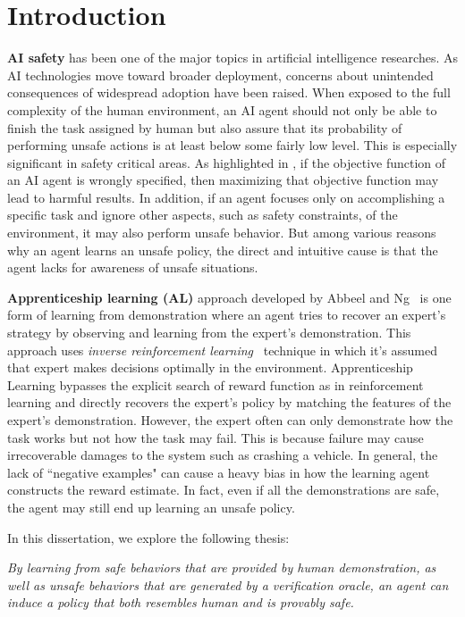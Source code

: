 \chapter{Introduction}
\label{chapter:Introduction}
\thispagestyle{myheadings}
{\bf AI safety} has been one of the major topics in artificial intelligence researches. As AI technologies move toward broader deployment, concerns about unintended consequences of widespread adoption have been raised. When exposed to the full complexity of the human environment, an AI agent should not only be able to finish the task assigned by human but also assure that its probability of performing unsafe actions is at least below some fairly low level. This is especially significant in safety critical areas. As highlighted in \cite{AmodeiOSCSM16}, if the objective function of an AI agent is wrongly specified, then maximizing that objective function may lead to harmful results. In addition, if an agent focuses only on accomplishing a specific task and ignore other aspects, such as safety constraints, of the environment, it may also perform unsafe behavior. But among various reasons why an agent learns an unsafe policy, the direct and intuitive cause is that the agent lacks for awareness of unsafe situations.  

{\bf Apprenticeship learning (AL)} approach developed by Abbeel and Ng~\cite{Abbeel:2004:ALV:1015330.1015430} is one form of learning from demonstration where an agent tries to recover an expert's strategy by observing and learning from the expert's demonstration. This approach uses {\it inverse reinforcement learning}~\cite{Ng:2000:AIR:645529.657801} technique in which it's assumed that expert makes decisions optimally in the environment. Apprenticeship Learning bypasses the explicit search of reward function as in reinforcement learning and directly recovers the expert's policy by matching the features of the expert's demonstration. However, the expert often can only demonstrate how the task works but not how the task may fail. This is because failure may cause irrecoverable damages to the system such as crashing a vehicle. In general, the lack of ``negative examples" can cause a heavy bias in how the learning agent constructs the reward estimate. In fact, even if all the demonstrations are safe, the agent may still end up learning an unsafe policy.

In this dissertation, we explore the following thesis:

\emph {
By learning from safe behaviors that are provided by human demonstration, as well as unsafe behaviors that are generated by a verification oracle, an agent can induce a policy that both resembles human and is provably safe. 
} 

